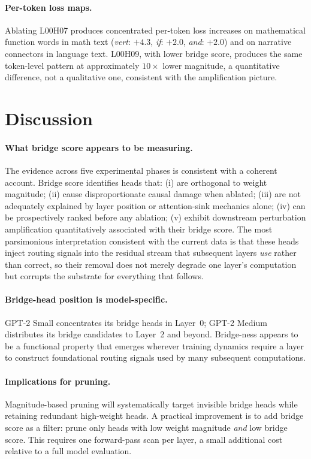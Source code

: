 \documentclass[11pt,a4paper]{article}
\theoremstyle{definition}
\theoremstyle{plain}
\begin{document}
\paragraph{Per-token loss maps.}
Ablating L00H07 produces concentrated per-token loss increases on
mathematical function words in math text (\textit{vert}: $+4.3$,
\textit{if}: $+2.0$, \textit{and}: $+2.0$) and on narrative connectors
in language text.
L00H09, with lower bridge score, produces the same token-level pattern
at approximately $10\times$ lower magnitude, a quantitative difference,
not a qualitative one, consistent with the amplification picture.

\section{Discussion}
\label{sec:discussion}

\paragraph{What bridge score appears to be measuring.}
The evidence across five experimental phases is consistent with a
coherent account.
Bridge score identifies heads that:
(i) are orthogonal to weight magnitude;
(ii) cause disproportionate causal damage when ablated;
(iii) are not adequately explained by layer position or attention-sink
mechanics alone;
(iv) can be prospectively ranked before any ablation;
(v) exhibit downstream perturbation amplification quantitatively
associated with their bridge score.
The most parsimonious interpretation consistent with the current data
is that these heads inject routing signals into the residual stream that
subsequent layers \emph{use} rather than correct, so their removal does
not merely degrade one layer's computation but corrupts the substrate
for everything that follows.

\paragraph{Bridge-head position is model-specific.}
GPT-2 Small concentrates its bridge heads in Layer~0; GPT-2 Medium
distributes its bridge candidates to Layer~2 and beyond.
Bridge-ness appears to be a functional property that emerges wherever
training dynamics require a layer to construct foundational routing signals
used by many subsequent computations.

\paragraph{Implications for pruning.}
Magnitude-based pruning will systematically target invisible bridge heads
while retaining redundant high-weight heads.
A practical improvement is to add bridge score as a filter: prune only
heads with low weight magnitude \emph{and} low bridge score.
This requires one forward-pass scan per layer, a small additional cost
relative to a full model evaluation.
\end{document}
